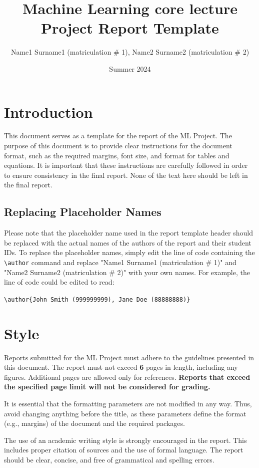 \documentclass{article}
\title{\large{Machine Learning core lecture}\vspace{3mm} \\  \Large{Project Report Template}  }
\author{Name1 Surname1  (matriculation \# 1), Name2 Surname2  (matriculation \# 2)}
\date{Summer 2024}
\begin{document}
\maketitle


\section{Introduction} 
This document serves as a template for the report of the ML Project. The purpose of this document is to provide clear instructions for the document format, such as the required margins, font size, and format for tables and equations. It is important that these instructions are carefully followed in order to ensure consistency in the final report. None of the text here should be left in the final report.


\subsection{Replacing Placeholder Names}

Please note that the placeholder name used in the report template header should be replaced with the actual names of the authors of the report and their student IDs. 
%
To replace the placeholder names, simply edit the line of code containing the \verb+\author+ command and replace "Name1 Surname1  (matriculation \# 1)" and "Name2 Surname2  (matriculation \# 2)" with your own names. For example, the line of code could be edited to read:

\verb+\author{John Smith (999999999), Jane Doe (88888888)}+



\section{Style}




Reports submitted for the ML Project must adhere to the guidelines presented in this document. The report must not exceed {\bf 6} pages in length, including any figures. Additional pages are allowed only for references. \textbf{Reports that exceed the specified page limit will not be considered for grading.}


It is essential that the formatting parameters are not modified in any way. Thus, avoid changing anything before the title, as these parameters define the format (e.g., margins) of the document and the required packages.


The use of an academic writing style is strongly encouraged in the report. This includes proper citation of sources and the use of formal language. The report should be clear, concise, and free of grammatical and spelling errors.
\end{document}
